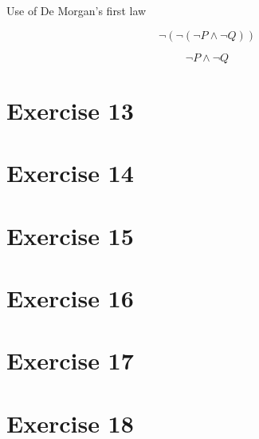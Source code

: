 \documentclass[11pt]{article}
\begin{document}
Use of De Morgan's first law

$$\neg(\neg(\neg P \wedge \neg Q))$$

$$\neg P \wedge \neg Q$$

\section*{Exercise 13}


\section*{Exercise 14}


\section*{Exercise 15}


\section*{Exercise 16}


\section*{Exercise 17}


\section*{Exercise 18}

\end{document}
